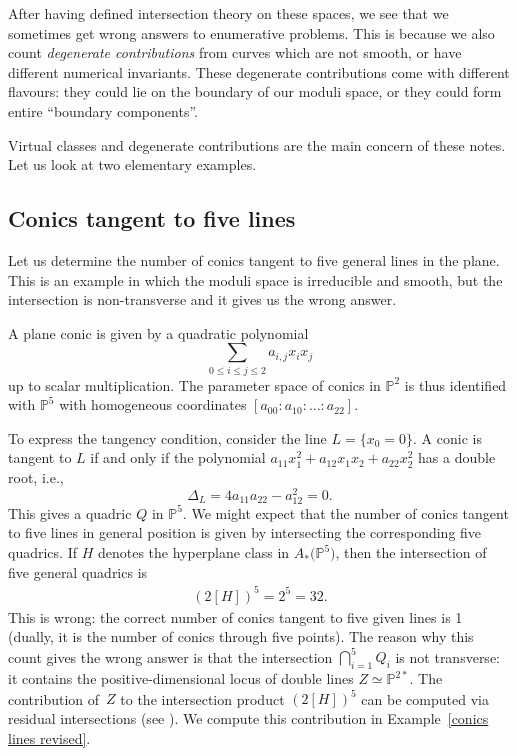 \documentclass[pdftex]{sigma}
\numberwithin{equation}{section}
\begin{document}
After having defined intersection theory on these spaces, we see that we sometimes get wrong answers to enumerative problems. This is because we also count \emph{degenerate contributions} from curves which are not smooth, or have different numerical invariants. These degenerate contributions come with different flavours: they could lie on the boundary of our moduli space, or they could form entire ``boundary components''.

Virtual classes and degenerate contributions are the main concern of these notes. Let us look at two elementary examples.

\subsection{Conics tangent to five lines}\label{conics five lines} Let us determine the number of conics tangent to five general lines in the plane. This is an example in which the moduli space is irreducible and smooth, but the intersection is non-transverse and it gives us the wrong answer.

A plane conic is given by a quadratic polynomial
\[\sum_{0\leq i\leq j\leq2}a_{i,j}x_ix_j\]
up to scalar multiplication. The parameter space of conics in $\mathbb P^2$ is thus identified with $\mathbb P^5$ with homogeneous coordinates $[a_{00}:a_{10}:\dots :a_{22}]$.

To express the tangency condition, consider the line $L=\{x_0=0\}$. A conic is tangent to $L$ if and only if the polynomial $a_{11}x_1^2+a_{12}x_1x_2+a_{22}x_2^2$ has a double root, i.e.,
\[
\Delta_{L}=4a_{11}a_{22}-a_{12}^2=0.
\]
This gives a quadric $Q$ in $\mathbb P^5$. We might expect that the number of conics tangent to five lines in general position is given by intersecting the corresponding five quadrics. If $H$ denotes the hyperplane class in $A_*\big(\mathbb P^5\big)$, then the intersection of five general quadrics is \begin{gather*}(2[H])^5=2^5=32.\end{gather*} This is wrong: the correct number of conics tangent to five given lines is 1 (dually, it is the number of conics through five points). The reason why this count gives the wrong answer is that the intersection $\bigcap_{i=1}^5 Q_i$ is not transverse: it contains the positive-dimensional locus of double lines $Z\simeq \mathbb P^{2*}$. The contribution of~$Z$ to the intersection product $(2[H])^5$ can be computed via residual intersections (see \cite[Chapter~9]{Fulton}). We compute this contribution in Example~\ref{conics lines revised}.
\end{document}
